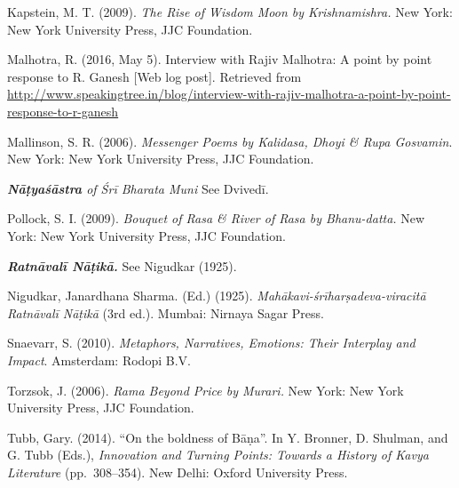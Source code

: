 \begin{thebibliography}{99}
Kapstein, M. T. (2009). \textsl{The Rise of Wisdom Moon by Krishnamishra.} New York: New York University Press, JJC Foundation.

Malhotra, R. (2016, May 5). Interview with Rajiv Malhotra: A point by point response to R. Ganesh [Web log post]. Retrieved from   \url{http://www.speakingtree.in/blog/interview-with-rajiv-malhotra-a-point-by-point-response-to-r-ganesh}

Mallinson, S. R. (2006). \textsl{Messenger Poems by Kalidasa, Dhoyi \& Rupa Gosvamin}. New York: New York University Press, JJC Foundation.

\textsl{\textbf{Nāṭyaśāstra} of Śrī Bharata Muni} See Dvivedī.

Pollock, S. I. (2009). \textsl{Bouquet of Rasa \& River of Rasa by Bhanu-datta.} New York: New York University Press, JJC Foundation.

\textsl{\textbf{Ratnāvalī Nāṭikā.}} See Nigudkar (1925).

Nigudkar, Janardhana Sharma. (Ed.) (1925). \textsl{Mahākavi-śrīharṣadeva-viracitā Ratnāvalī Nāṭikā} (3rd ed.). Mumbai: Nirnaya Sagar Press.

Snaevarr, S. (2010). \textsl{Metaphors, Narratives, Emotions: Their Interplay and Impact}. Amsterdam: Rodopi B.V.

Torzsok, J. (2006). \textsl{Rama Beyond Price by Murari.} New York: New York University Press, JJC Foundation.

Tubb, Gary. (2014). “On the boldness of Bāṇa”. In Y. Bronner, D. Shulman, and G. Tubb (Eds.), \textsl{Innovation and Turning Points: Towards a History of Kavya Literature} (pp.~308--354). New Delhi: Oxford University Press.
\end{thebibliography}

\theendnotes
\label{chapter\thechapter:end}
